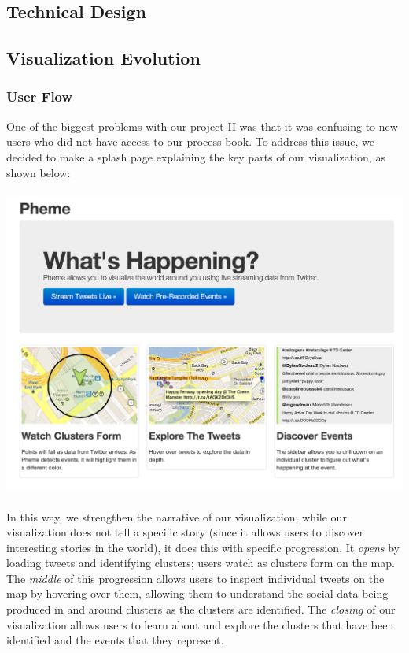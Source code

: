 \documentclass[pdftex,12pt,a4paper]{article}
\begin{document}
\subsection{Technical Design}

\subsection{Visualization Evolution}
\subsubsection{User Flow}
One of the biggest problems with our project II was that it was confusing to new users who did not have access to our process book. To address this issue, we decided to make a splash page explaining the key parts of our visualization, as shown below: \\ \\
\includegraphics[width=5.5in]{splash.png} \\ \\
In this way, we strengthen the narrative of our visualization; while our visualization does not tell a specific story (since it allows users to discover interesting stories in the world), it does this with specific progression. It \emph{opens} by loading tweets and identifying clusters; users watch as clusters form on the map. The \emph{middle} of this progression allows users to inspect individual tweets on the map by hovering over them, allowing them to understand the social data being produced in and around clusters as the clusters are identified. The \emph{closing} of our visualization allows users to learn about and explore the clusters that have been identified and the events that they represent.
\end{document}
